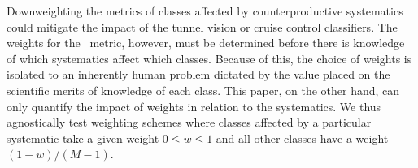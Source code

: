 Downweighting the metrics of classes affected by counterproductive systematics could mitigate the impact of the tunnel vision or cruise control classifiers.
The weights for the \plasticc\ metric, however, must be determined before there is knowledge of which systematics affect which classes.
Because of this, the choice of weights is isolated to an inherently human problem dictated by the value placed on the scientific merits of knowledge of each class.
This paper, on the other hand, can only quantify the impact of weights in relation to the systematics.
We thus agnostically test weighting schemes where classes affected by a particular systematic take a given weight $0 \leq w \leq 1$ and all other classes have a weight $(1 - w) / (M - 1)$.
